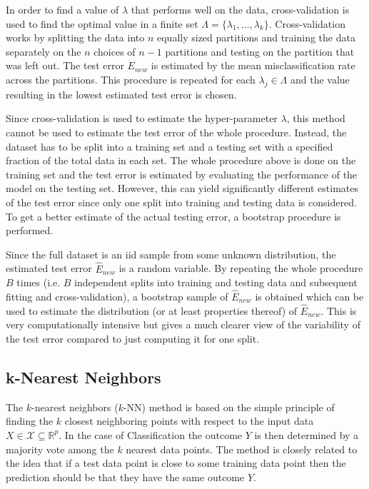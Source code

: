 \documentclass{article}
\begin{document}
In order to find a value of $\lambda$ that performs well on the data, cross-validation is used to find the optimal value in a finite set $\Lambda = \{ \lambda_1,\dots,\lambda_k \}$. Cross-validation works by splitting the data into $n$ equally sized partitions and training the data separately on the $n$ choices of $n-1$ partitions and testing on the partition that was left out. The test error $E_{new}$ is estimated by the mean misclassification rate across the partitions. This procedure is repeated for each $\lambda_j \in \Lambda$ and the value resulting in the lowest estimated test error is chosen.

Since cross-validation is used to estimate the hyper-parameter $\lambda$, this method cannot be used to estimate the test error of the whole procedure. Instead, the dataset has to be split into a training set and a testing set with a specified fraction of the total data in each set. The whole procedure above is done on the training set and the test error is estimated by evaluating the performance of the model on the testing set. However, this can yield significantly different estimates of the test error since only one split into training and testing data is considered. To get a better estimate of the actual testing error, a bootstrap procedure is performed.

Since the full dataset is an iid sample from some unknown distribution, the estimated test error $\hat E_{new}$ is a random variable. By repeating the whole procedure $B$ times (i.e. $B$ independent splits into training and testing data and subsequent fitting and cross-validation), a bootstrap sample of $\hat E_{new}$ is obtained which can be used to estimate the distribution (or at least properties thereof) of $\hat E_{new}$. This is very computationally intensive but gives a much clearer view of the variability of the test error compared to just computing it for one split.

\subsection{k-Nearest Neighbors}
The $k$-nearest neighbors ($k$-NN) method is based on the simple principle of finding the $k$ closest neighboring points with respect to the input data $X \in \mathcal{X} \subseteq \mathbb{R}^p$. In the case of Classification the outcome $Y$ is then determined by a majority vote among the $k$ nearest data points. The method is closely related to the idea that if a test data point is close to some training data point then the prediction should be that they have the same outcome $Y$.
\end{document}
